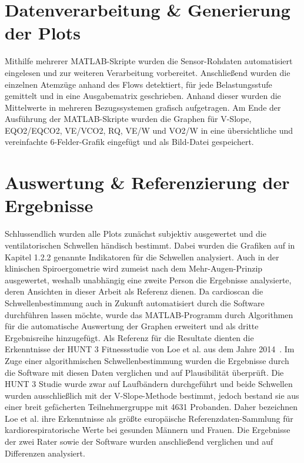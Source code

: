 \section{Datenverarbeitung \& Generierung der Plots}
%
Mithilfe mehrerer MATLAB-Skripte wurden die Sensor-Rohdaten automatisiert eingelesen und zur weiteren Verarbeitung vorbereitet. Anschließend wurden die einzelnen Atemzüge anhand des Flows detektiert, für jede Belastungsstufe gemittelt und in eine Ausgabematrix geschrieben. Anhand dieser wurden die Mittelwerte in mehreren Bezugssystemen grafisch aufgetragen. Am Ende der Ausführung der MATLAB-Skripte wurden die Graphen für V-Slope, \gls{EQO2}/\gls{EQCO2}, \gls{VE}/\gls{VCO2}, \gls{RQ}, \gls{VE}/\gls{W} und \gls{VO2}/\gls{W} in eine übersichtliche und vereinfachte 6-Felder-Grafik eingefügt und als Bild-Datei gespeichert. 
%
\section{Auswertung \& Referenzierung der Ergebnisse}
%
Schlussendlich wurden alle Plots zunächst subjektiv ausgewertet und die ventilatorischen Schwellen händisch bestimmt. Dabei wurden die Grafiken auf in Kapitel 1.2.2 genannte Indikatoren für die Schwellen analysiert. Auch in der klinischen Spiroergometrie wird zumeist nach dem Mehr-Augen-Prinzip ausgewertet, weshalb unabhängig eine zweite Person die Ergebnisse analysierte, deren Ansichten in dieser Arbeit als Referenz dienen. Da cardioscan die Schwellenbestimmung auch in Zukunft automatisiert durch die Software durchführen lassen möchte, wurde das MATLAB-Programm durch Algorithmen für die automatische Auswertung der Graphen erweitert und als dritte Ergebnisreihe hinzugefügt. Als Referenz für die Resultate dienten die Erkenntnisse der HUNT 3 Fitnessstudie von Loe et al. aus dem Jahre 2014~\cite{Loe.2014}. Im Zuge einer algorithmischen Schwellenbestimmung wurden die Ergebnisse durch die Software mit diesen Daten verglichen und auf Plausibilität überprüft. Die HUNT 3 Studie wurde zwar auf Laufbändern durchgeführt und beide Schwellen wurden ausschließlich mit der V-Slope-Methode bestimmt, jedoch bestand sie aus einer breit gefächerten Teilnehmergruppe mit 4631 Probanden. Daher bezeichnen Loe et al. ihre Erkenntnisse als größte europäische Referenzdaten-Sammlung für kardiorespiratorische Werte bei gesunden Männern und Frauen. Die Ergebnisse der zwei Rater sowie der Software wurden anschließend verglichen und auf Differenzen analysiert.
%
